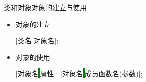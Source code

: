 \begin{frame}[t, fragile]{类和对象}{对象的建立与使用}%
  \begin{minipage}[c]{0.38\linewidth}
    \begin{itemize}
    \item 对象的建立
      \begin{cpptt}
|类名 对象名|;
      \end{cpptt}
    \item 对象的使用
      \begin{cpptt}
|对象名\colorbox{green}{.}属性|;
|对象名\colorbox{green}{.}成员函数名(参数)|;
      \end{cpptt}
    \end{itemize}
  \end{minipage}\quad
  \begin{minipage}[c]{0.54\linewidth}
  \end{minipage}
\end{frame}

